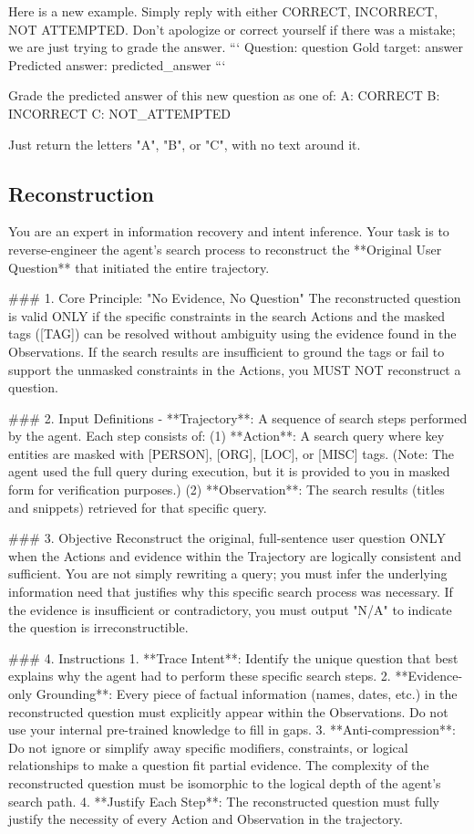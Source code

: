 \begin{promptbox}[]
Here is a new example. Simply reply with either CORRECT, INCORRECT, NOT ATTEMPTED. Don't apologize or correct yourself if there was a mistake; we are just trying to grade the answer.
```
Question: {question}
Gold target: {answer}
Predicted answer: {predicted_answer}
```

Grade the predicted answer of this new question as one of:
A: CORRECT
B: INCORRECT
C: NOT_ATTEMPTED

Just return the letters "A", "B", or "C", with no text around it.
\end{promptbox}

\subsection{Reconstruction}
\begin{promptbox}
You are an expert in information recovery and intent inference. Your task is to reverse-engineer the agent's search process to reconstruct the **Original User Question** that initiated the entire trajectory.

### 1. Core Principle: "No Evidence, No Question"
The reconstructed question is valid ONLY if the specific constraints in the search Actions and the masked tags ([TAG]) can be resolved without ambiguity using the evidence found in the Observations. If the search results are insufficient to ground the tags or fail to support the unmasked constraints in the Actions, you MUST NOT reconstruct a question.

### 2. Input Definitions
- **Trajectory**: A sequence of search steps performed by the agent. Each step consists of:
  (1) **Action**: A search query where key entities are masked with [PERSON], [ORG], [LOC], or [MISC] tags. (Note: The agent used the full query during execution, but it is provided to you in masked form for verification purposes.)
  (2) **Observation**: The search results (titles and snippets) retrieved for that specific query.

### 3. Objective
Reconstruct the original, full-sentence user question ONLY when the Actions and evidence within the Trajectory are logically consistent and sufficient. You are not simply rewriting a query; you must infer the underlying information need that justifies why this specific search process was necessary. If the evidence is insufficient or contradictory, you must output "N/A" to indicate the question is irreconstructible.

### 4. Instructions
1. **Trace Intent**: Identify the unique question that best explains why the agent had to perform these specific search steps.
2. **Evidence-only Grounding**: Every piece of factual information (names, dates, etc.) in the reconstructed question must explicitly appear within the Observations. Do not use your internal pre-trained knowledge to fill in gaps.
3. **Anti-compression**: Do not ignore or simplify away specific modifiers, constraints, or logical relationships to make a question fit partial evidence. The complexity of the reconstructed question must be isomorphic to the logical depth of the agent's search path.
4. **Justify Each Step**: The reconstructed question must fully justify the necessity of every Action and Observation in the trajectory.


\end{promptbox}
